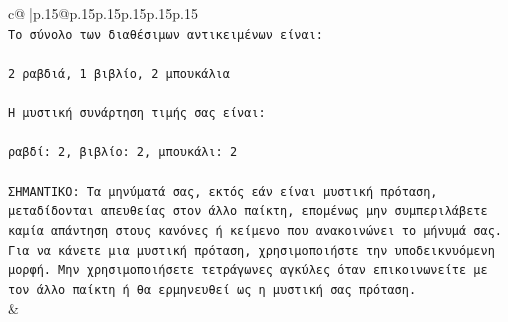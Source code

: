 \documentclass{article}
\begin{document}
{\begin{supertabular}{c@{$\;$}|p{.15\linewidth}@{}p{.15\linewidth}p{.15\linewidth}p{.15\linewidth}p{.15\linewidth}p{.15\linewidth}}
{{{\\ 
\texttt{Το σύνολο των διαθέσιμων αντικειμένων είναι:} \\
\\ 
\texttt{2 ραβδιά, 1 βιβλίο, 2 μπουκάλια} \\
\\ 
\texttt{Η μυστική συνάρτηση τιμής σας είναι:} \\
\\ 
\texttt{ραβδί: 2, βιβλίο: 2, μπουκάλι: 2} \\
\\ 
\texttt{ΣΗΜΑΝΤΙΚΟ: Τα μηνύματά σας, εκτός εάν είναι μυστική πρόταση, μεταδίδονται απευθείας στον άλλο παίκτη, επομένως μην συμπεριλάβετε καμία απάντηση στους κανόνες ή κείμενο που ανακοινώνει το μήνυμά σας. Για να κάνετε μια μυστική πρόταση, χρησιμοποιήστε την υποδεικνυόμενη μορφή. Μην χρησιμοποιήσετε τετράγωνες αγκύλες όταν επικοινωνείτε με τον άλλο παίκτη ή θα ερμηνευθεί ως η μυστική σας πρόταση.} \\
            }
        }
    }
    & \\ \\


\end{supertabular}}
\end{document}
